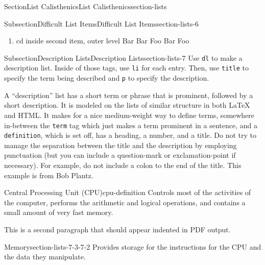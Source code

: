 \documentclass[twoside,10pt,]{article}
\newcommand{\mono}[1]{\texttt{#1}}
\numberwithin{equation}{section}
\begin{document}
\begin{sectionptx}{Section}{List Calisthenics}{}{List Calisthenics}{}{}{section-lists}
\begin{subsectionptx}{Subsection}{Difficult List Items}{}{Difficult List Items}{}{}{section-lists-6}
\begin{enumerate}
\begin{enumerate}
\item{}%
\begin{codedisplayleft}
Third inner item, cd only
Foo Bar Foo
Foo Bar Foo
Bar Foo Bar
\end{codedisplayleft}
%
\end{enumerate}
%
\item{}%
\begin{codedisplayleft}
cd inside second item, outer level
Bar
Bar Foo Bar
Foo
\end{codedisplayleft}
%
\end{enumerate}
%
\end{subsectionptx}
%
%
\typeout{************************************************}
\typeout{************************************************}
%
\begin{subsectionptx}{Subsection}{Description Lists}{}{Description Lists}{}{}{section-lists-7}
Use \mono{dl} to make a description list. Inside of those tags, use \mono{li} for each entry. Then, use \mono{title} to specify the term being described and \mono{p} to specify the description.%
\par
A ``description'' list  has a short term or phrase that is prominent, followed by a short description.  It is modeled on the lists of similar structure in both \LaTeX{} and HTML.  It makes for a nice medium-weight way to define terms, somewhere in-between the \mono{term} tag which just makes a term prominent in a sentence, and a \mono{definition}, which is set off, has a heading, a number, and a title.  Do not try to manage the separation between the title and the description by employing punctuation (but you can include a question-mark or exclamation-point if necessary).  For example, do not include a colon to the end of the title.  This example is from Bob Plantz.%
\begin{descriptionlist}
\begin{dlimedium}{Central Processing Unit (CPU)}{cpu-definition}%
Controls most of the activities of the computer, performs the arithmetic and logical operations, and contains a small amount of very fast memory.%
\par
This is a second paragraph that should appear indented in PDF output.%
\end{dlimedium}%
\begin{dlimedium}{Memory}{section-lists-7-3-7-2}%
Provides storage for the instructions for the CPU and the data they manipulate.%

\end{dlimedium}
\end{descriptionlist}
\end{subsectionptx}
\end{sectionptx}
\end{document}

